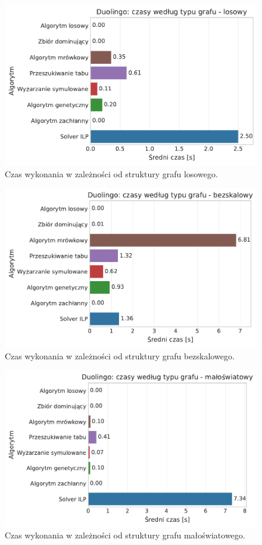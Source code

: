 \begin{figure}[H]
  \centering
  \includegraphics[width=0.65\linewidth]{assets/figures/benchmark/synthetic/duolingo_time_by_graph_random.pdf}
  \caption{Czas wykonania w zależności od struktury grafu losowego.}
  \label{fig:duo-synth-time-random}
\end{figure}

\begin{figure}[H]
  \centering
  \includegraphics[width=0.65\linewidth]{assets/figures/benchmark/synthetic/duolingo_time_by_graph_scale_free.pdf}
  \caption{Czas wykonania w zależności od struktury grafu bezskalowego.}
  \label{fig:duo-synth-time-scale-free}
\end{figure}

\begin{figure}[H]
  \centering
  \includegraphics[width=0.65\linewidth]{assets/figures/benchmark/synthetic/duolingo_time_by_graph_small_world.pdf}
  \caption{Czas wykonania w zależności od struktury grafu małoświatowego.}
  \label{fig:duo-synth-time-small-world}
\end{figure}

